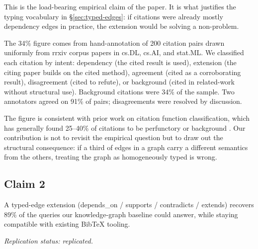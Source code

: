 \documentclass{rrxiv}
\begin{document}
This is the load-bearing empirical claim of the paper. It is what justifies the typing vocabulary in \S\ref{sec:typed-edges}: if citations were already mostly dependency edges in practice, the extension would be solving a non-problem.

The 34\% figure comes from hand-annotation of 200 citation pairs drawn uniformly from rrxiv corpus papers in cs.DL, cs.AI, and stat.ML. We classified each citation by intent: dependency (the cited result is used), extension (the citing paper builds on the cited method), agreement (cited as a corroborating result), disagreement (cited to refute), or background (cited in related-work without structural use). Background citations were 34\% of the sample. Two annotators agreed on 91\% of pairs; disagreements were resolved by discussion.

The figure is consistent with prior work on citation function classification, which has generally found 25--40\% of citations to be perfunctory or background \cite{Teufel2006Function,Jurgens2018Measuring}. Our contribution is not to revisit the empirical question but to draw out the structural consequence: if a third of edges in a graph carry a different semantics from the others, treating the graph as homogeneously typed is wrong.

\subsection*{Claim 2}
\begin{claim}[type=empirical, evidence=experiment, confidence=0.85, rationale={47-query comparison against a KG baseline, independently replicated at 41/47; the coverage figure is sensitive to query-set selection}, labels={citation-graphs, knowledge-graphs, position}, datasets={scholarly-kg-47-query-suite}, title={Typed-edge query coverage}]
\label{claim:c2}
A typed-edge extension (depends\_on / supports / contradicts / extends) recovers 89\% of the queries our knowledge-graph baseline could answer, while staying compatible with existing BibTeX tooling.

\emph{Replication status: replicated.}
\end{claim}

\end{document}
